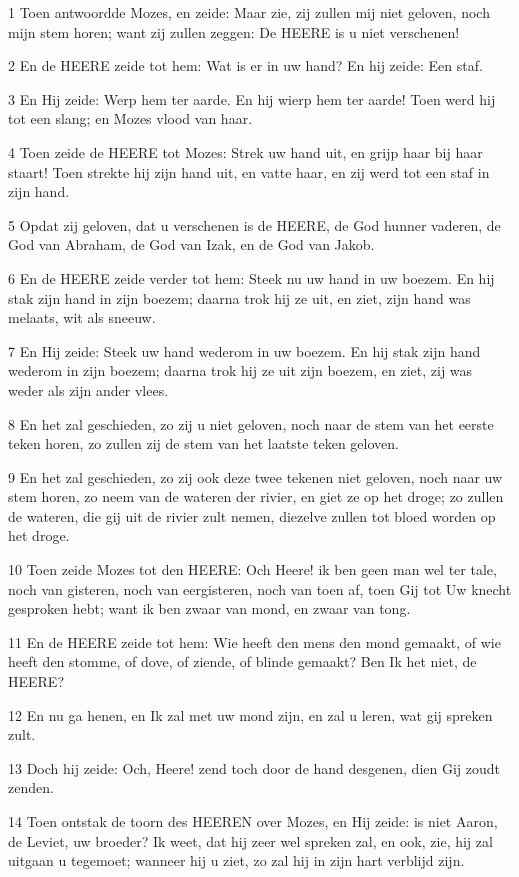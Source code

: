 \par 1 Toen antwoordde Mozes, en zeide: Maar zie, zij zullen mij niet geloven, noch mijn stem horen; want zij zullen zeggen: De HEERE is u niet verschenen!
\par 2 En de HEERE zeide tot hem: Wat is er in uw hand? En hij zeide: Een staf.
\par 3 En Hij zeide: Werp hem ter aarde. En hij wierp hem ter aarde! Toen werd hij tot een slang; en Mozes vlood van haar.
\par 4 Toen zeide de HEERE tot Mozes: Strek uw hand uit, en grijp haar bij haar staart! Toen strekte hij zijn hand uit, en vatte haar, en zij werd tot een staf in zijn hand.
\par 5 Opdat zij geloven, dat u verschenen is de HEERE, de God hunner vaderen, de God van Abraham, de God van Izak, en de God van Jakob.
\par 6 En de HEERE zeide verder tot hem: Steek nu uw hand in uw boezem. En hij stak zijn hand in zijn boezem; daarna trok hij ze uit, en ziet, zijn hand was melaats, wit als sneeuw.
\par 7 En Hij zeide: Steek uw hand wederom in uw boezem. En hij stak zijn hand wederom in zijn boezem; daarna trok hij ze uit zijn boezem, en ziet, zij was weder als zijn ander vlees.
\par 8 En het zal geschieden, zo zij u niet geloven, noch naar de stem van het eerste teken horen, zo zullen zij de stem van het laatste teken geloven.
\par 9 En het zal geschieden, zo zij ook deze twee tekenen niet geloven, noch naar uw stem horen, zo neem van de wateren der rivier, en giet ze op het droge; zo zullen de wateren, die gij uit de rivier zult nemen, diezelve zullen tot bloed worden op het droge.
\par 10 Toen zeide Mozes tot den HEERE: Och Heere! ik ben geen man wel ter tale, noch van gisteren, noch van eergisteren, noch van toen af, toen Gij tot Uw knecht gesproken hebt; want ik ben zwaar van mond, en zwaar van tong.
\par 11 En de HEERE zeide tot hem: Wie heeft den mens den mond gemaakt, of wie heeft den stomme, of dove, of ziende, of blinde gemaakt? Ben Ik het niet, de HEERE?
\par 12 En nu ga henen, en Ik zal met uw mond zijn, en zal u leren, wat gij spreken zult.
\par 13 Doch hij zeide: Och, Heere! zend toch door de hand desgenen, dien Gij zoudt zenden.
\par 14 Toen ontstak de toorn des HEEREN over Mozes, en Hij zeide: is niet Aaron, de Leviet, uw broeder? Ik weet, dat hij zeer wel spreken zal, en ook, zie, hij zal uitgaan u tegemoet; wanneer hij u ziet, zo zal hij in zijn hart verblijd zijn.
